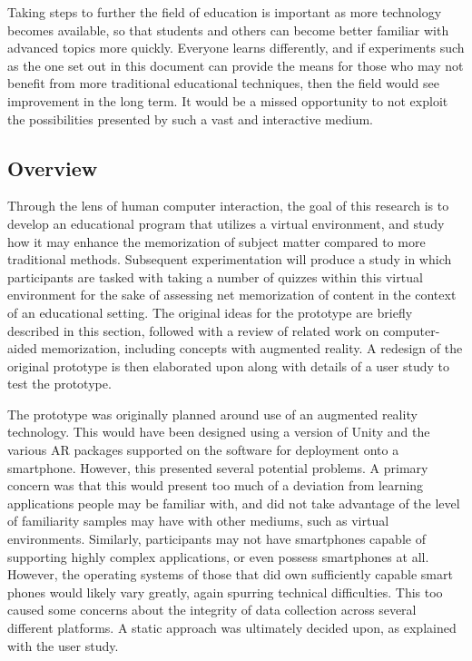 \documentclass{vgtc}                          %
\begin{document}
Taking steps to further the field of education is important as more technology becomes available, so that students and others can become better familiar with advanced topics more quickly. Everyone learns differently, and if experiments such as the one set out in this document can provide the means for those who may not benefit from more traditional educational techniques, then the field would see improvement in the long term. It would be a missed opportunity to not exploit the possibilities presented by such a vast and interactive medium.

\subsection{Overview}

Through the lens of human computer interaction, the goal of this research is to develop an educational program that utilizes a virtual environment, and study how it may enhance the memorization of subject matter compared to more traditional methods. Subsequent experimentation will produce a study in which participants are tasked with taking a number of quizzes within this virtual environment for the sake of assessing net memorization of content in the context of an educational setting. The original ideas for the prototype are briefly described in this section, followed with a review of related work on computer-aided memorization, including concepts with augmented reality. A redesign of the original prototype is then elaborated upon along with details of a user study to test the prototype.

The prototype was originally planned around use of an augmented reality technology. This would have been designed using a version of Unity and the various AR packages supported on the software for deployment onto a smartphone. However, this presented several potential problems. A primary concern was that this would present too much of a deviation from learning applications people may be familiar with, and did not take advantage of the level of familiarity samples may have with other mediums, such as virtual environments. Similarly, participants may not have smartphones capable of supporting highly complex applications, or even possess smartphones at all. However, the operating systems of those that did own sufficiently capable smart phones would likely vary greatly, again spurring technical difficulties. This too caused some concerns about the integrity of data collection across several different platforms. A static approach was ultimately decided upon, as explained with the user study.
\end{document}
